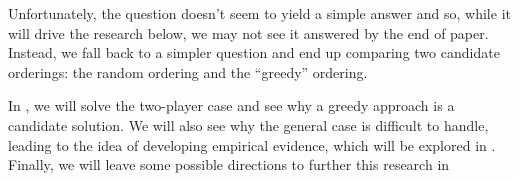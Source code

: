 Unfortunately, the question doesn't seem to yield a simple answer and so, while it will drive the research below, we may not see it answered by the end of paper.
Instead, we fall back to a simpler question and end up comparing two candidate orderings: the random ordering and the ``greedy'' ordering.

In , we will solve the two-player case and see why a greedy approach is a candidate solution.
We will also see why the general case is difficult to handle, leading to the idea of developing empirical evidence, which will be explored in .
Finally, we will leave some possible directions to further this research in 